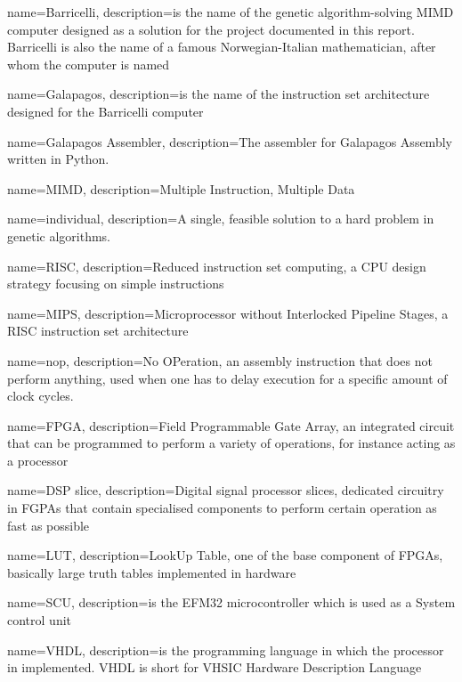 {
name=Barricelli,
description={is the name of the genetic algorithm-solving MIMD computer designed as a solution for the project documented in this report. Barricelli is also the name of a famous Norwegian-Italian mathematician, after whom the computer is named}
}

{
name=Galapagos,
description={is the name of the instruction set architecture designed for the Barricelli computer}
}

{
name=Galapagos Assembler,
description={The assembler for Galapagos Assembly written in Python.}
}

{
name=MIMD,
description={Multiple Instruction, Multiple Data}
}

{
name=individual,
description={A single, feasible solution to a hard problem in genetic algorithms.}
}

{
name=RISC,
description={Reduced instruction set computing, a CPU design strategy focusing on simple instructions}
}

{
name=MIPS,
description={Microprocessor without Interlocked Pipeline Stages, a RISC instruction set architecture}
}

{
name=nop,
description={No OPeration, an assembly instruction that does not perform anything, used when one has to delay execution for a specific amount of clock cycles.}
}

{
name=FPGA,
description={Field Programmable Gate Array, an integrated circuit that can be programmed to perform a variety of operations, for instance acting as a processor}
}

{
name=DSP slice,
description={Digital signal processor slices, dedicated circuitry in FGPAs that contain specialised components to perform certain operation as fast as possible}
}

{
name=LUT,
description={LookUp Table, one of the base component of FPGAs, basically large truth tables implemented in hardware}
}

{
name=SCU,
description={is the EFM32 microcontroller which is used as a System control unit}
}

{
name=VHDL,
description={is the programming language in which the processor in implemented. VHDL is short for \gls{VHSIC} Hardware Description Language}
}

